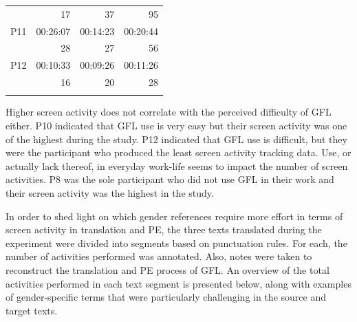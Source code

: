 \begin{table}[ht]
\begin{tabular}{crrr}
           & \cellcolor{yellow!25}17 & 37 & \cellcolor{red!25}95 \\
       P11 & \cellcolor{red!25}00:26:07 & \cellcolor{yellow!25}00:14:23 & 00:20:44 \\
           & 28 & \cellcolor{yellow!25}27 & \cellcolor{red!25}56\\
       P12 & 00:10:33 & \cellcolor{yellow!25}00:09:26 & \cellcolor{red!25}00:11:26 \\
           & \cellcolor{yellow!25}16 & 20 & \cellcolor{red!25}28\\
\lspbottomrule
    \end{tabular}
    \label{tab:temporal/technicaleffort}
\end{table}

Higher screen activity does not correlate with the perceived difficulty of GFL either. P10 indicated that GFL use is very easy but their screen activity was one of the highest during the study. P12 indicated that GFL use is difficult, but they were the participant who produced the least screen activity tracking data. Use, or actually lack thereof, in everyday work-life seems to impact the number of screen activities. P8 was the sole participant who did not use GFL in their work and their screen activity was the highest in the study. 

In order to shed light on which gender references require more effort in terms of screen activity in translation and PE, the three texts translated during the experiment were divided into segments based on punctuation rules. For each, the number of activities performed was annotated. Also, notes were taken to reconstruct the translation and PE process of GFL. An overview of the total activities performed in each text segment is presented below, along with examples of gender-specific terms that were particularly challenging in the source and target texts.  

